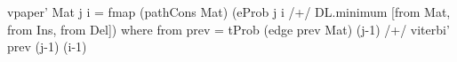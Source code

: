 vpaper' Mat j i = fmap (pathCons Mat)
  (eProb j i /+/ DL.minimum [from Mat, from Ins, from Del]) 
 where from prev = tProb (edge prev Mat) (j-1) /+/
                               viterbi' prev (j-1) (i-1)
